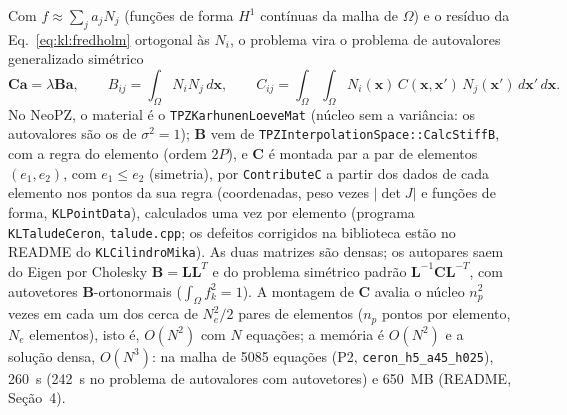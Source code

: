 Com $f \approx \sum_j a_j N_j$ (funções de forma $H^1$ contínuas da malha de $\Omega$) e o resíduo da
Eq.~\eqref{eq:kl:fredholm} ortogonal às $N_i$, o problema vira o problema de autovalores generalizado simétrico
\begin{equation}
  \mathbf{C} \mathbf{a} = \lambda \mathbf{B} \mathbf{a}, \qquad
  B_{ij} = \int_\Omega N_i N_j \, d\mathbf{x}, \qquad
  C_{ij} = \int_\Omega \int_\Omega N_i(\mathbf{x}) \, C(\mathbf{x}, \mathbf{x}') \, N_j(\mathbf{x}') \, d\mathbf{x}' \, d\mathbf{x}.
  \label{eq:kl:galerkin}
\end{equation}
No NeoPZ, o material é o \texttt{TPZKarhunenLoeveMat} (núcleo sem a variância: os autovalores são os de
$\sigma^2 = 1$); $\mathbf{B}$ vem de \texttt{TPZInterpolationSpace::CalcStiffB}, com a regra do elemento (ordem $2P$),
e $\mathbf{C}$ é montada par a par de elementos $(e_1, e_2)$, com $e_1 \le e_2$ (simetria), por
\texttt{ContributeC} a partir dos dados de cada elemento nos pontos da sua regra (coordenadas, peso vezes $|\det J|$ e
funções de forma, \texttt{KLPointData}), calculados uma vez por elemento (programa \texttt{KLTaludeCeron},
\texttt{talude.cpp}; os defeitos corrigidos na biblioteca estão no README do \texttt{KLCilindroMika}). As duas matrizes
são densas; os autopares saem do Eigen por Cholesky $\mathbf{B} = \mathbf{L}\mathbf{L}^T$ e do problema simétrico
padrão $\mathbf{L}^{-1} \mathbf{C} \mathbf{L}^{-T}$, com autovetores $\mathbf{B}$-ortonormais ($\int_\Omega f_k^2 = 1$).
A montagem de $\mathbf{C}$ avalia o núcleo $n_p^2$ vezes em cada um dos cerca de $N_e^2/2$ pares de elementos
($n_p$ pontos por elemento, $N_e$ elementos), isto é, $O(N^2)$ com $N$ equações; a memória é $O(N^2)$ e a solução
densa, $O(N^3)$: na malha de 5085 equações (P2, \texttt{ceron\_h5\_a45\_h025}), 260~s
(242~s no problema de autovalores com autovetores) e 650~MB (README, Seção~4).


